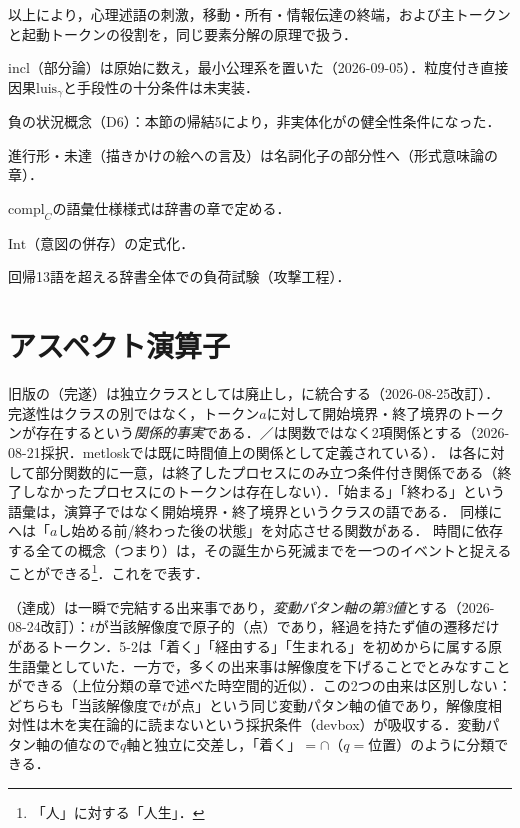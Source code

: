 \documentclass[../../main-detail.tex]{subfiles}
\begin{document}
以上により，心理述語の刺激，移動・所有・情報伝達の終端，および主トークンと起動トークンの役割を，同じ要素分解の原理で扱う．

\begin{araidashi}
    \item $\mathrm{incl}$（部分論）は原始に数え，最小公理系を置いた（2026-09-05）．粒度付き直接因果$\mathrm{luis}_\gamma$と手段性の十分条件は未実装．
    \item 負の状況概念（D6）：本節の帰結5により，非実体化がの健全性条件になった．
    \item 進行形・未達（描きかけの絵への言及）は名詞化子の部分性へ（形式意味論の章）．
    \item $\mathrm{compl}_C$の語彙仕様様式は辞書の章で定める．
    \item $\mathrm{Int}$（意図の併存）の定式化．
    \item 回帰13語を超える辞書全体での負荷試験（攻撃工程）．
\end{araidashi}

\section{アスペクト演算子}
旧版の（完遂）は独立クラスとしては廃止し，に統合する（2026-08-25改訂）．完遂性はクラスの別ではなく，トークン$a$に対して開始境界・終了境界のトークンが存在するという\emph{関係的事実}である．／は関数ではなく2項関係とする（2026-08-21採択．metloskでは既に時間値上の関係として定義されている）．
は各に対して部分関数的に一意，は終了したプロセスにのみ立つ条件付き関係である（終了しなかったプロセスにのトークンは存在しない）．「始まる」「終わる」という語彙は，演算子ではなく開始境界・終了境界というクラスの語である．
同様にへは「$a$し始める前/終わった後の状態」を対応させる関数がある．
時間に依存する全ての概念（つまり）は，その誕生から死滅までを一つのイベントと捉えることができる\footnote{「人」に対する「人生」．}．これをで表す．

（達成）は一瞬で完結する出来事であり，\emph{変動パタン軸の第3値}とする（2026-08-24改訂）：$t$が当該解像度で原子的（点）であり，経過を持たず値の遷移だけがあるトークン．5-2は「着く」「経由する」「生まれる」を初めからに属する原生語彙としていた．一方で，多くの出来事は解像度を下げることでとみなすことができる（上位分類の章で述べた時空間的近似）．この2つの由来は区別しない：どちらも「当該解像度で$t$が点」という同じ変動パタン軸の値であり，解像度相対性は木を実在論的に読まないという採択条件（devbox）が吸収する．変動パタン軸の値なので$q$軸と独立に交差し，「着く」$=$$\cap$（$q=$位置）のように分類できる．
\end{document}
